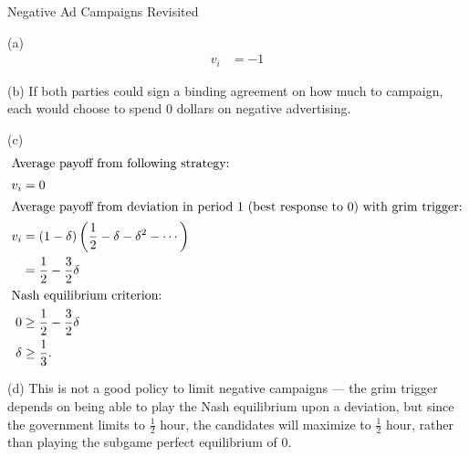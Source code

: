 \documentclass[8pt]{extarticle}
\begin{document}
\begin{problem}{Negative Ad Campaigns Revisited}
\begin{problem}{(a)}
\begin{align*}
        v_i &= -1
      \end{align*}
    \end{problem}
    \begin{problem}{(b)}
      If both parties could sign a binding agreement on how much to campaign, each would choose to spend $0$ dollars on negative advertising.
    \end{problem}
    \begin{problem}{(c)}
      \begin{align*}
        \shortintertext{Average payoff from following strategy:}
        v_i &= 0\\
        \shortintertext{Average payoff from deviation in period $1$ (best response to $0$) with grim trigger:}
        v_i &= (1-\delta)\left(\frac{1}{2} - \delta - \delta^2 - \cdots\right)\\
            &= \frac{1}{2}-\frac{3}{2}\delta\\
        \shortintertext{Nash equilibrium criterion:}
        0 &\geq \frac{1}{2} - \frac{3}{2}\delta\\
        \delta &\geq \frac{1}{3}.
      \end{align*}
    \end{problem}
    \begin{problem}{(d)}
      This is not a good policy to limit negative campaigns --- the grim trigger depends on being able to play the Nash equilibrium upon a deviation, but since the government limits to $\frac{1}{2}$ hour, the candidates will maximize to $\frac{1}{2}$ hour, rather than playing the subgame perfect equilibrium of $0$.
    \end{problem}
  \end{problem}
\end{document}
